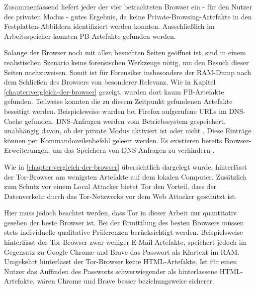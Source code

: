 \begin{comment}
Weiterführende Arbeiten:
> Cross-mode interference \cite{Hedberg.2013}:
	o	the Chrome://memory page displays all the opened tabs in the browser regardless if they are in the usual or private mode -> Nicht mehr aktuell -> Stattdessen: Chrome Task-manager (Ctrl + Esc), Funktioniert auch bei Firefox
> Unser Scope: Process Monitor nach Prozessnamen gefiltert
	- Weiterführend: Nach Pathnamen filtern: "Common Locations"

> Für wen wird Browser entwickelt
> Warum und für wen wird Private Browsing analysiert?
> Ist das Auffinden privater Browsing-Artefakte Schuld von Browser Entwicklern? (Oder Schuld des Betriebssystem, wie in (TODO!) erwähnt)
\end{comment}

Zusammenfassend liefert jeder der vier betrachteten Browser ein - für den Nutzer des privaten Modus - gutes Ergebnis, da keine Private-Browsing-Artefakte in den Festplatten-Abbildern identifiziert werden konnten. 
Ausschließlich im Arbeitsspeicher konnten PB-Artefakte gefunden werden.

Solange der Browser noch mit allen besuchten Seiten geöffnet ist, sind in einem realistischen Szenario keine forensischen Werkzeuge nötig, um den Besuch dieser Seiten nachzuweisen. Somit ist für Forensiker insbesondere der RAM-Dump nach dem Schließen des Browsers von besonderer Relevanz. 
Wie in Kapitel \ref{chapter:vergleich-der-browser} gezeigt, wurden dort kaum PB-Artefakte gefunden.
Teilweise konnten die zu diesem Zeitpunkt gefundenen Artefakte beseitigt werden.
Beispielsweise wurden bei Firefox aufgerufene URLs im DNS-Cache gefunden. DNS-Anfragen werden vom Betriebssystem gespeichert, unabhängig davon, ob der private Modus aktiviert ist oder nicht \cite{Satvat.2014}. Diese Einträge können per Kommandozeilenbefehl geleert werden. Es existieren bereits Browser-Erweiterungen, um das Speichern von DNS-Anfragen zu verhindern \cite{Satvat.2014}.

Wie in \autoref{chapter:vergleich-der-browser} übersichtlich dargelegt wurde, hinterlässt der Tor-Browser am wenigsten Artefakte auf dem lokalen Computer. 
Zusätzlich zum Schutz vor einem Local Attacker bietet Tor den Vorteil, dass der Datenverkehr durch das Tor-Netzwerks vor dem Web Attacker geschützt ist. 

Hier muss jedoch beachtet werden, dass Tor in dieser Arbeit nur quantitativ gesehen der beste Browser ist.
Bei der Ermittlung des besten Browsers müssen stets individuelle qualitative Präferenzen berücksichtigt werden. 
Beispielsweise hinterlässt der Tor-Browser zwar weniger E-Mail-Artefakte, speichert jedoch im Gegensatz zu Google Chrome und Brave das Passwort als Klartext im RAM. Umgekehrt hinterlässt der Tor-Browser keine HTML-Artefakte.
Ist für einen Nutzer das Auffinden des Passworts schwerwiegender als hinterlassene HTML-Artefakte, wären Chrome und Brave \glqq{}besser\grqq{} beziehungsweise \glqq{}sicherer\grqq{}.

